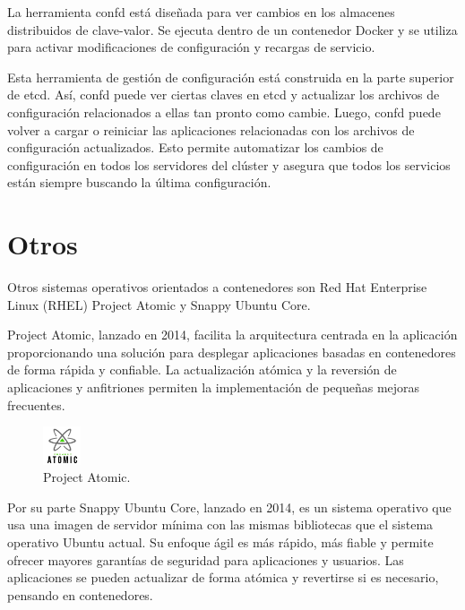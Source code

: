 La herramienta confd está diseñada para ver cambios en los almacenes distribuidos de clave-valor. Se ejecuta dentro de un contenedor Docker y se utiliza para activar modificaciones de configuración y recargas de servicio.

Esta herramienta de gestión de configuración está construida en la parte superior de etcd. Así, confd puede ver ciertas claves en etcd y actualizar los archivos de configuración relacionados a ellas tan pronto como cambie. Luego, confd puede volver a cargar o reiniciar las aplicaciones relacionadas con los archivos de configuración actualizados. Esto permite automatizar los cambios de configuración en todos los servidores del clúster y asegura que todos los servicios están siempre buscando la última configuración.

\section{Otros}

Otros sistemas operativos orientados a contenedores son Red Hat Enterprise Linux (RHEL) Project Atomic\cite{rhel7} y Snappy Ubuntu Core\cite{ubuntucore}.

Project Atomic, lanzado en 2014, facilita la arquitectura centrada en la aplicación proporcionando una solución para desplegar aplicaciones basadas en contenedores de forma rápida y confiable. La actualización atómica y la reversión de aplicaciones y anfitriones permiten la implementación de pequeñas mejoras frecuentes.

\begin{figure}[H]
\centering
\includegraphics[width=0.1\textwidth]{images/figures/projectatomic.png}
\caption{Project Atomic.\footnotemark}
\end{figure}


Por su parte Snappy Ubuntu Core, lanzado en 2014, es un sistema operativo que usa una imagen de servidor mínima con las mismas bibliotecas que el sistema operativo Ubuntu actual. Su enfoque ágil es más rápido, más fiable y permite ofrecer mayores garantías de seguridad para aplicaciones y usuarios. Las aplicaciones se pueden actualizar de forma atómica y revertirse si es necesario, pensando en contenedores.

